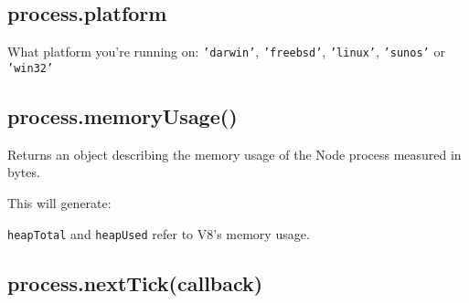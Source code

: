 \subsection{process.platform}

What platform you're running on: \texttt{'darwin'}, \texttt{'freebsd'},
\texttt{'linux'}, \texttt{'sunos'} or \texttt{'win32'}

\begin{Shaded}
\begin{Highlighting}[]
\NormalTok{(} \NormalTok{+ }\NormalTok{);}
\end{Highlighting}
\end{Shaded}

\subsection{process.memoryUsage()}

Returns an object describing the memory usage of the Node process
measured in bytes.

\begin{Shaded}
\begin{Highlighting}[]
 \NormalTok{);}

\NormalTok{(}\NormalTok{(}\NormalTok{()));}
\end{Highlighting}
\end{Shaded}

This will generate:

\begin{Shaded}
\begin{Highlighting}[]
\NormalTok{\{ }\NormalTok{: }\NormalTok{,}
  \NormalTok{: }\NormalTok{,}
  \NormalTok{: } \NormalTok{\}}
\end{Highlighting}
\end{Shaded}

\texttt{heapTotal} and \texttt{heapUsed} refer to V8's memory usage.

\subsection{process.nextTick(callback)}

